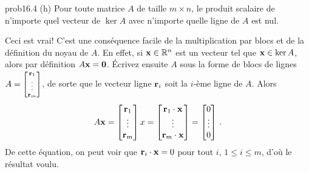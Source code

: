 \begin{sol}{prob16.4}
(h)  Pour toute matrice $A$ de taille $m\times n$, le produit scalaire de n'importe quel vecteur de $\ker A$ avec n'importe quelle ligne de $A$ est nul.

\soln Ceci est vrai! C'est une conséquence facile de la multiplication par blocs et de la définition du noyau de $A$. En effet, si $\mathbf{x}\in \mathbb{R}^n$ est un vecteur tel que $\mathbf{x}\in \ker A$, alors par définition $A\mathbf{x}=\mathbf{0}$. \'Ecrivez ensuite $A$ sous la forme de blocs de lignes $A=\scriptsize\bmatrix \rr_1\\\vdots\\ \rr_m\endbmatrix$, de sorte que le vecteur ligne $\mathbf{r}_i$ soit la $i$-{ème} ligne de $A$. Alors 
$$A\xx= \bmatrix \rr_1\\\vdots\\ \rr_m\endbmatrix x=\bmatrix \rr_1\cdot \xx \\ \vdots\\ \rr_m\cdot \xx\endbmatrix= \bmatrix 0\\\vdots\\ 0\endbmatrix\,.$$ 
De cette équation, on peut voir que $\mathbf{r}_i \cdot \mathbf{x} =0$ pour tout $i$, $1\le i\le m$, d'où le résultat voulu.


\end{sol}

